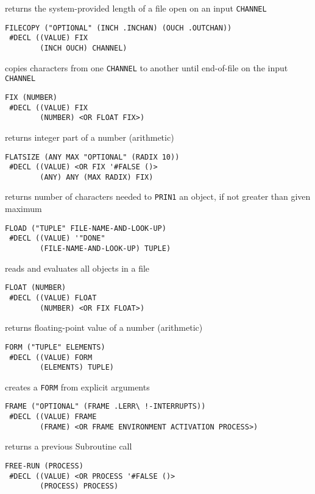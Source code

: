 \documentclass[a4paper,]{article}
\begin{document}
returns the system-provided length of a file open on an input \texttt{CHANNEL}

\begin{verbatim}
FILECOPY ("OPTIONAL" (INCH .INCHAN) (OUCH .OUTCHAN))
 #DECL ((VALUE) FIX
        (INCH OUCH) CHANNEL)
\end{verbatim}

copies characters from one \texttt{CHANNEL} to another until end-of-file on the input \texttt{CHANNEL}

\begin{verbatim}
FIX (NUMBER)
 #DECL ((VALUE) FIX
        (NUMBER) <OR FLOAT FIX>)
\end{verbatim}

returns integer part of a number (arithmetic)

\begin{verbatim}
FLATSIZE (ANY MAX "OPTIONAL" (RADIX 10))
 #DECL ((VALUE) <OR FIX '#FALSE ()>
        (ANY) ANY (MAX RADIX) FIX)
\end{verbatim}

returns number of characters needed to \texttt{PRIN1} an object, if not greater than given maximum

\begin{verbatim}
FLOAD ("TUPLE" FILE-NAME-AND-LOOK-UP)
 #DECL ((VALUE) '"DONE"
        (FILE-NAME-AND-LOOK-UP) TUPLE)
\end{verbatim}

reads and evaluates all objects in a file

\begin{verbatim}
FLOAT (NUMBER)
 #DECL ((VALUE) FLOAT
        (NUMBER) <OR FIX FLOAT>)
\end{verbatim}

returns floating-point value of a number (arithmetic)

\begin{verbatim}
FORM ("TUPLE" ELEMENTS)
 #DECL ((VALUE) FORM
        (ELEMENTS) TUPLE)
\end{verbatim}

creates a \texttt{FORM} from explicit arguments

\begin{verbatim}
FRAME ("OPTIONAL" (FRAME .LERR\ !-INTERRUPTS))
 #DECL ((VALUE) FRAME
        (FRAME) <OR FRAME ENVIRONMENT ACTIVATION PROCESS>)
\end{verbatim}

returns a previous Subroutine call

\begin{verbatim}
FREE-RUN (PROCESS)
 #DECL ((VALUE) <OR PROCESS '#FALSE ()>
        (PROCESS) PROCESS)
\end{verbatim}
\end{document}
